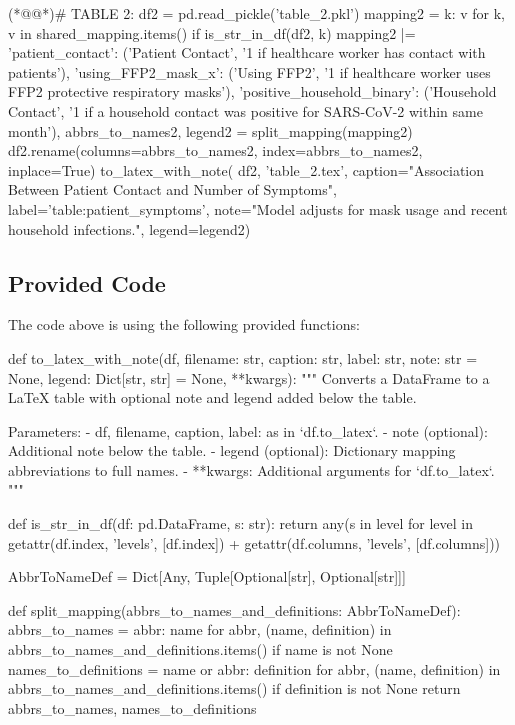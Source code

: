 \documentclass[11pt]{article}
\begin{document}
\begin{python}
(*@@*)# TABLE 2:
df2 = pd.read_pickle('table_2.pkl')
mapping2 = {
    k: v for k, v in shared_mapping.items() if is_str_in_df(df2, k)
}
mapping2 |= {
    'patient_contact': ('Patient Contact', '1 if healthcare worker has contact with patients'),
    'using_FFP2_mask_x': ('Using FFP2', '1 if healthcare worker uses FFP2 protective respiratory masks'),
    'positive_household_binary': ('Household Contact', '1 if a household contact was positive for SARS-CoV-2 within same month'),
}
abbrs_to_names2, legend2 = split_mapping(mapping2)
df2.rename(columns=abbrs_to_names2, index=abbrs_to_names2, inplace=True)
to_latex_with_note(
    df2, 'table_2.tex',
    caption="Association Between Patient Contact and Number of Symptoms",
    label='table:patient_symptoms',
    note="Model adjusts for mask usage and recent household infections.",
    legend=legend2)

\end{python}

\subsection{Provided Code}
The code above is using the following provided functions:

\begin{python}
def to_latex_with_note(df, filename: str, caption: str, label: str, note: str = None, legend: Dict[str, str] = None, **kwargs):
    """
    Converts a DataFrame to a LaTeX table with optional note and legend added below the table.

    Parameters:
    - df, filename, caption, label: as in `df.to_latex`.
    - note (optional): Additional note below the table.
    - legend (optional): Dictionary mapping abbreviations to full names.
    - **kwargs: Additional arguments for `df.to_latex`.
    """

def is_str_in_df(df: pd.DataFrame, s: str):
    return any(s in level for level in getattr(df.index, 'levels', [df.index]) + getattr(df.columns, 'levels', [df.columns]))

AbbrToNameDef = Dict[Any, Tuple[Optional[str], Optional[str]]]

def split_mapping(abbrs_to_names_and_definitions: AbbrToNameDef):
    abbrs_to_names = {abbr: name for abbr, (name, definition) in abbrs_to_names_and_definitions.items() if name is not None}
    names_to_definitions = {name or abbr: definition for abbr, (name, definition) in abbrs_to_names_and_definitions.items() if definition is not None}
    return abbrs_to_names, names_to_definitions

\end{python}
\end{document}
